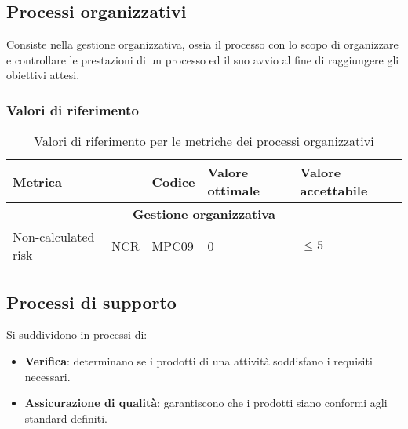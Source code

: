 \subsection{Processi organizzativi}
Consiste nella gestione organizzativa, ossia il processo con lo scopo di organizzare e controllare le prestazioni di un processo ed il suo avvio al fine di raggiungere gli obiettivi attesi.

\subsubsection{Valori di riferimento}
\begin{table}[H]
	\centering
	\begin{tabularx}{\textwidth}{p{3.5cm}|X|X|l|l}
		\hline
		\multicolumn{2}{l|}{\textbf{Metrica}} & \textbf{Codice} & \textbf{Valore ottimale} & \textbf{Valore accettabile}           \\
		\hline
		\multicolumn{5}{c}{\textbf{Gestione organizzativa}}                                                                        \\
		\hline
		Non-calculated risk                   & NCR             & MPC09                    & 0                           & $\le 5$ \\
		\hline
	\end{tabularx}
	\caption{Valori di riferimento per le metriche dei processi organizzativi}
\end{table}

\subsection{Processi di supporto}
Si suddividono in processi di:
\begin{itemize}
	\item \textbf{Verifica}: determinano se i prodotti di una attività soddisfano i requisiti necessari.
	\item \textbf{Assicurazione di qualità}: garantiscono che i prodotti siano conformi agli standard definiti.
\end{itemize}
